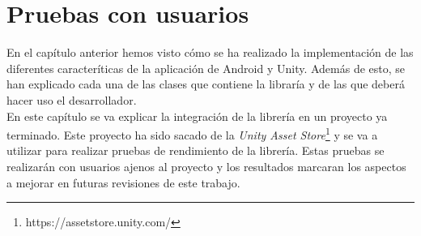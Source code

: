 %
%
%
%
%
%
%
%
%
%

\chapter{Pruebas con usuarios}
\label{cap5}
\label{cap:pruebas}

En el cap\'itulo anterior hemos visto c\'omo se ha realizado la implementaci\'on de las diferentes caracter\'iticas de la aplicaci\'on de Android y Unity. Adem\'as de esto, se han explicado cada una de las clases que contiene la librar\'ia y de las que deber\'a hacer uso el desarrollador.\\
En este cap\'itulo se va explicar la integraci\'on de la librer\'ia en un proyecto ya terminado. Este proyecto ha sido sacado de la \textit{Unity Asset Store}\footnote{https://assetstore.unity.com/} y se va a utilizar para realizar pruebas de rendimiento de la librer\'ia. Estas pruebas se realizar\'an con usuarios ajenos al proyecto y los resultados marcaran los aspectos a mejorar en futuras revisiones de este trabajo. \\


